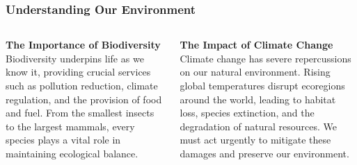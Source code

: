 \documentclass[5pt]{beamer}
\begin{document}
\begin{frame}
\frametitle{Understanding Our Environment}
\begin{columns}
\begin{column}{0.45\textwidth}
\begin{block}{\textbf{The Importance of Biodiversity}}
Biodiversity underpins life as we know it, providing crucial services such as pollution reduction, climate regulation, and the provision of food and fuel. From the smallest insects to the largest mammals, every species plays a vital role in maintaining ecological balance.
\end{block}
\end{column}
\begin{column}{0.45\textwidth}
\begin{block}{\textbf{The Impact of Climate Change}}
Climate change has severe repercussions on our natural environment. Rising global temperatures disrupt ecoregions around the world, leading to habitat loss, species extinction, and the degradation of natural resources. We must act urgently to mitigate these damages and preserve our environment.
\end{block}
\end{column}
\end{columns}
\end{frame}
\end{document}
